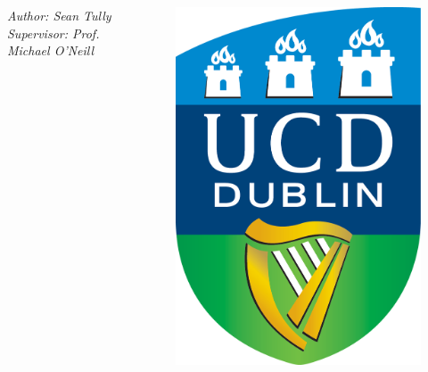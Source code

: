 \documentclass[final]{beamer}
\begin{document}
\begin{frame}[t]
\begin{columns}
            \huge \emph{Author: Sean Tully \quad Supervisor: Prof. Michael
                O'Neill}
                \begin{figure}
                    \centering
                    \includegraphics[angle=0,scale=0.08]{ucd_logo.png}
                \end{figure}
        \end{columns}
        
        \vspace{0.5cm}
        

\end{frame}
\end{document}
